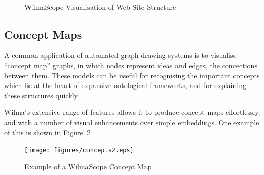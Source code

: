 \documentclass[runningheads]{cl2emult}
\begin{document}
\begin{figure}
\begin{center}
 \\
\caption{{\sc WilmaScope Visualisation of Web Site Structure}}
\label{fig-web}
\end{center}
\end{figure}

\subsection{Concept Maps}

A common application of automated graph drawing systems is to visualise
``concept map'' graphs, in which nodes represent ideas and edges, the
concections between them.  These models can be useful for recognising
the important concepts which lie at the heart of expansive ontological
frameworks, and for explaining these structures quickly.

Wilma's extensive range of features allows it to produce concept maps
effortlessly, and with a number of visual enhancements over simple
embeddings.  One example of this is shown in Figure~\ref{fig-concept}

\begin{figure}
\begin{center}
\texttt{[image: figures/concepts2.eps]} \\
\caption{{\sc Example of a WilmaScope Concept Map}}
\label{fig-concept}
\end{center}
\end{figure}
\end{document}

